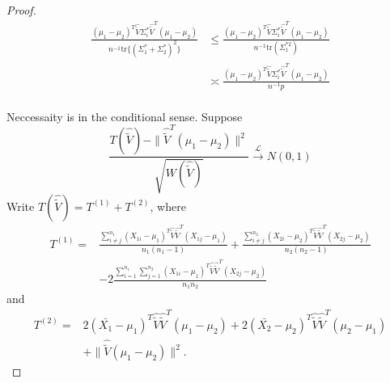 \begin{proof}
    \begin{equation*}
        \begin{aligned}
        \frac{{(\mu_1-\mu_2)}^T \hat{\tilde{V}}\Sigma_i^*\hat{\tilde{V}}^T (\mu_1-\mu_2)}{n^{-1}\mathrm{tr}\{{(\Sigma_1^*+\Sigma_2^*)}^2\}}
            &\leq
            \frac{{(\mu_1-\mu_2)}^T \hat{\tilde{V}}\Sigma_i^*\hat{\tilde{V}}^T (\mu_1-\mu_2)}{n^{-1}\mathrm{tr}(\Sigma_1^{*2})}\\
            &\asymp
            \frac{{(\mu_1-\mu_2)}^T \hat{\tilde{V}}\Sigma_i^*\hat{\tilde{V}}^T (\mu_1-\mu_2)}{n^{-1}p}\\
        \end{aligned}
    \end{equation*}

     Neccessaity is in the conditional sense. Suppose
\begin{equation}
        \frac{T(\hat{\tilde{V}})-\|\hat{\tilde{V}}^T(\mu_1-\mu_2)\|^2}
        {\sqrt{W(\hat{\tilde{V}})}}
        \xrightarrow{\mathcal{L}} N(0,1)
\end{equation}
Write $T(\hat{\tilde{V}})=T^{(1)}+T^{(2)}$, where
\begin{equation*}
\begin{aligned}
    T^{(1)}=&\frac{\sum_{i\neq j}^{n_1}{(X_{1i}-\mu_1)}^T\hat{\tilde{V}}\hat{\tilde{V}}^T(X_{1j}-\mu_1)}{n_1(n_1-1)}+\frac{\sum_{i\neq j}^{n_2}{(X_{2i}-\mu_2)}^T\hat{\tilde{V}}\hat{\tilde{V}}^T(X_{2j}-\mu_2)}{n_2(n_2-1)}
\\
    &-2\frac{\sum_{i=1}^{n_1}\sum_{j=1}^{n_2}{(X_{1i}-\mu_1)}^T\hat{\tilde{V}}\hat{\tilde{V}}^T(X_{2j}-\mu_2)}{n_1n_2}
\end{aligned}
\end{equation*}
and
\begin{equation*}
\begin{aligned}
    T^{(2)}=&2{(\bar{X_{1}}-\mu_1)}^T\hat{\tilde{V}}\hat{\tilde{V}}^T(\mu_1-\mu_2)+
    2{(\bar{X_{2}}-\mu_2)}^T\hat{\tilde{V}}\hat{\tilde{V}}^T(\mu_2-\mu_1)
\\
    &+\|\hat{\tilde{V}}(\mu_1-\mu_2)\|^2.
\end{aligned}
\end{equation*}
   

\end{proof}
